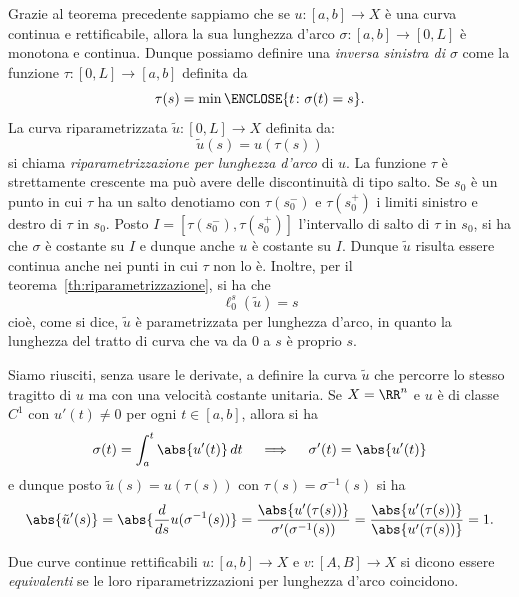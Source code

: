 Grazie al teorema precedente sappiamo che se $u\colon [a,b] \to X$ è una curva continua e rettificabile, 
allora la sua lunghezza d'arco $\sigma\colon[a,b] \to [0,L]$ è monotona e continua.
Dunque possiamo definire una \emph{inversa sinistra di $\sigma$} 
come la funzione $\tau\colon [0,L] \to [a,b]$ definita da
\[
  \tau(s) = \min \ENCLOSE{t\colon \sigma(t)=s}.
\]
La curva riparametrizzata $\tilde u\colon [0,L] \to X$ definita da:
\[
  \tilde u(s) = u(\tau(s))
\]
si chiama \emph{riparametrizzazione per lunghezza d'arco} di $u$.
La funzione $\tau$ è strettamente crescente ma può avere delle discontinuità 
di tipo salto. Se $s_0$ è un punto in cui $\tau$ ha un salto denotiamo con 
$\tau(s_0^-)$ e $\tau(s_0^+)$ i limiti sinistro e destro di $\tau$ in $s_0$.
Posto $I = [\tau(s_0^-), \tau(s_0^+)]$ 
l'intervallo di salto di $\tau$ in $s_0$, 
si ha che $\sigma$ è costante su $I$ e dunque anche $u$ è costante su $I$.
Dunque $\tilde u$ risulta essere continua anche nei punti in cui $\tau$ non lo è.
Inoltre, per il teorema~\ref{th:riparametrizzazione}, si ha che 
\[
  \ell_0^s(\tilde u) = s
\]
cioè, come si dice, $\tilde u$ è parametrizzata per lunghezza d'arco, in quanto 
la lunghezza del tratto di curva che va da $0$ a $s$ è proprio $s$.

Siamo riusciti, senza usare le derivate, a definire la curva $\tilde u$ che percorre 
lo stesso tragitto di $u$ ma con una velocità costante unitaria. 
Se $X=\RR^n$ e $u$ è di classe $C^1$ con $u'(t)\neq 0$ per ogni $t\in[a,b]$,
allora si ha 
\[
  \sigma(t) = \int_a^t \abs{u'(t)}\, dt 
  \quad\implies\quad
  \sigma'(t) = \abs{u'(t)} 
\]
e dunque posto $\tilde u(s) = u(\tau(s))$ con $\tau(s) = \sigma^{-1}(s)$ si ha
\[
 \abs{\tilde u'(s)}
 = \abs{\frac{d}{ds} u(\sigma^{-1}(s))}
 = \frac{\abs{u'(\tau(s))}}{\sigma'(\sigma^{-1}(s))}
 = \frac{\abs{u'(\tau(s))}}{\abs{u'(\tau(s))}} = 1.
\]


\begin{definition}
Due curve continue rettificabili $u \colon [a,b] \to X$ e $v \colon [A,B] \to X$ 
si dicono essere \emph{equivalenti} se le loro riparametrizzazioni per 
lunghezza d'arco coincidono.
\end{definition}


